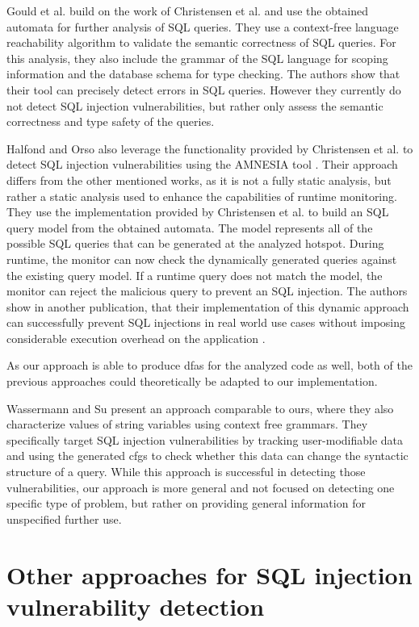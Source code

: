 Gould et al. \cite{gould2004static} build on the work of Christensen et al. and use the obtained automata for further analysis of SQL queries. They use a context-free language reachability algorithm to validate the semantic correctness of SQL queries. For this analysis, they also include the grammar of the SQL language for scoping information and the database schema for type checking.
The authors show that their tool can precisely detect errors in SQL queries. However they currently do not detect SQL injection vulnerabilities, but rather only assess the semantic correctness and type safety of the queries.

Halfond and Orso also leverage the functionality provided by Christensen et al. to detect SQL injection vulnerabilities using the AMNESIA tool \cite{amnesia}. Their approach differs from the other mentioned works, as it is not a fully static analysis, but rather a static analysis used to enhance the capabilities of runtime monitoring. They use the implementation provided by Christensen et al. to build an SQL query model from the obtained automata. The model represents all of the possible SQL queries that can be generated at the analyzed hotspot.
During runtime, the monitor can now check the dynamically generated queries against the existing query model. If a runtime query does not match the model, the monitor can reject the malicious query to prevent an SQL injection. The authors show in another publication, that their implementation of this dynamic approach can successfully prevent SQL injections in real world use cases without imposing considerable execution overhead on the application \cite{amnesia_evaluation}.

As our approach is able to produce \acp{dfa} for the analyzed code as well, both of the previous approaches could theoretically be adapted to our implementation.

Wassermann and Su \cite{sqli_wassermann_su} present an approach comparable to ours, where they also characterize values of string variables using context free grammars. They specifically target SQL injection vulnerabilities by tracking user-modifiable data and using the generated \acp{cfg} to check whether this data can change the syntactic structure of a query. While this approach is successful in detecting those vulnerabilities, our approach is more general and not focused on detecting one specific type of problem, but rather on providing general information for unspecified further use.

\section{Other approaches for SQL injection vulnerability detection}

